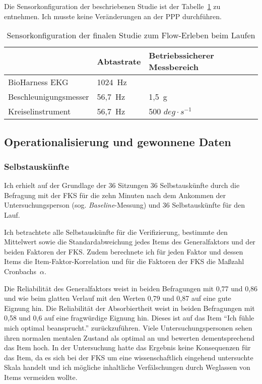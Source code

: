 Die Sensorkonfiguration der beschriebenen Studie ist der Tabelle~\ref{tab:sensorkonfiguration_studie_laufen} zu entnehmen. Ich musste keine Veränderungen an der \ac{PPP} durchführen. 

\begin{table}[t]
	\caption[Sensorkonfiguration der finalen Studie zum Flow-Erleben beim Laufen]{Sensorkonfiguration der finalen Studie zum Flow-Erleben beim Laufen}
	\label{tab:sensorkonfiguration_studie_laufen}
	\begin{tabularx}{\textwidth}{p{} p{} p{}}
\toprule
& Abtastrate & Betriebssicherer Messbereich \\
\midrule
BioHarness EKG & 1024~Hz & \\
Beschleunigungsmesser & 56,7~Hz & 1,5~g \\
Kreiselinstrument & 56,7~Hz & 500 $deg \cdot s^{-1}$ \\
\bottomrule
\end{tabularx}
\end{table}

\subsection{Operationalisierung und gewonnene Daten}

\subsubsection{Selbstauskünfte}
Ich erhielt auf der Grundlage der 36 Sitzungen 36 Selbstauskünfte durch die Befragung mit der \ac{FKS} für die zehn Minuten nach dem Ankommen der Untersuchungsperson (sog. \emph{Baseline}-Messung) und 36 Selbstauskünfte für den Lauf. 

Ich betrachtete alle Selbstauskünfte für die Verifizierung, bestimmte den Mittelwert sowie die Standardabweichung jedes Items des Generalfaktors und der beiden Faktoren der \ac{FKS}. Zudem berechnete ich für jeden Faktor und dessen Items die Item-Faktor-Korrelation und für die Faktoren der \ac{FKS} die Maßzahl Cronbachs~$\alpha$. 

Die Reliabilität des Generalfaktors weist in beiden Befragungen mit 0,77 und 0,86 und wie beim glatten Verlauf mit den Werten 0,79 und 0,87 auf eine gute Eignung hin. Die Reliabilität der Absorbiertheit weist in beiden Befragungen mit 0,58 und 0,6 auf eine fragwürdige Eignung hin. Dieses ist auf das Item "`Ich fühle mich optimal beansprucht."' zurückzuführen. Viele Untersuchungspersonen sehen ihren normalen mentalen Zustand als optimal an und bewerten dementsprechend das Item hoch. In der Untersuchung hatte das Ergebnis keine Konsequenzen für das Item, da es sich bei der \ac{FKS} um eine wissenschaftlich eingehend untersuchte Skala handelt und ich mögliche inhaltliche Verfälschungen durch Weglassen von Items vermeiden wollte. 

